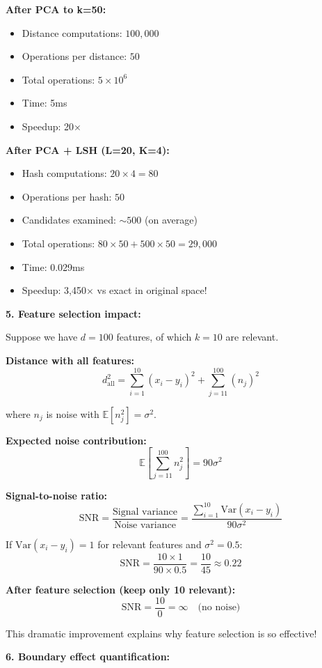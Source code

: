 \documentclass[12pt]{article}
\begin{document}
\begin{computation}
\textbf{After PCA to k=50:}
\begin{itemize}
    \item Distance computations: \(100,000\)
    \item Operations per distance: \(50\)
    \item Total operations: \(5 \times 10^6\)
    \item Time: 5ms
    \item Speedup: 20×
\end{itemize}

\textbf{After PCA + LSH (L=20, K=4):}
\begin{itemize}
    \item Hash computations: \(20 \times 4 = 80\)
    \item Operations per hash: \(50\)
    \item Candidates examined: \(\sim 500\) (on average)
    \item Total operations: \(80 \times 50 + 500 \times 50 = 29,000\)
    \item Time: 0.029ms
    \item Speedup: 3,450× vs exact in original space!
\end{itemize}

\textbf{5. Feature selection impact:}

Suppose we have \(d=100\) features, of which \(k=10\) are relevant.

\textbf{Distance with all features:}
\[
d_{\text{all}}^2 = \sum_{i=1}^{10} (x_i - y_i)^2 + \sum_{j=11}^{100} (n_j)^2
\]

where \(n_j\) is noise with \(\mathbb{E}[n_j^2] = \sigma^2\).

\textbf{Expected noise contribution:}
\[
\mathbb{E}\left[\sum_{j=11}^{100} n_j^2\right] = 90\sigma^2
\]

\textbf{Signal-to-noise ratio:}
\[
\text{SNR} = \frac{\text{Signal variance}}{\text{Noise variance}} = \frac{\sum_{i=1}^{10} \text{Var}(x_i - y_i)}{90\sigma^2}
\]

If \(\text{Var}(x_i - y_i) = 1\) for relevant features and \(\sigma^2 = 0.5\):
\[
\text{SNR} = \frac{10 \times 1}{90 \times 0.5} = \frac{10}{45} \approx 0.22
\]

\textbf{After feature selection (keep only 10 relevant):}
\[
\text{SNR} = \frac{10}{0} = \infty \quad \text{(no noise)}
\]

This dramatic improvement explains why feature selection is so effective!

\textbf{6. Boundary effect quantification:}


\end{computation}
\end{document}
